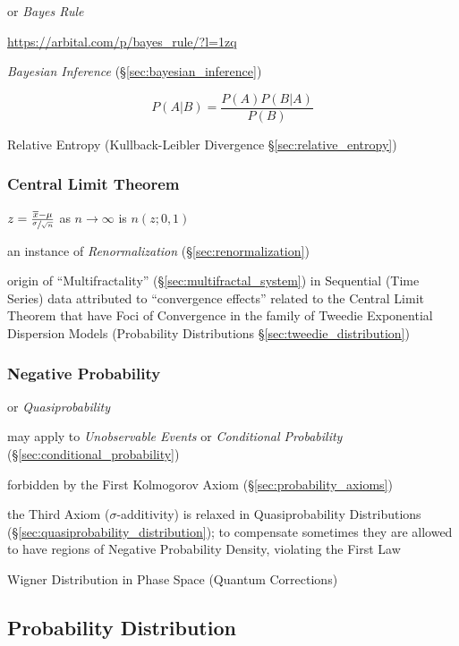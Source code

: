or \emph{Bayes Rule}

\url{https://arbital.com/p/bayes_rule/?l=1zq}

\emph{Bayesian Inference} (\S\ref{sec:bayesian_inference})

\[
  P(A|B) = \frac{P(A)P(B|A)}{P(B)}
\]

\fist Relative Entropy (Kullback-Leibler Divergence
\S\ref{sec:relative_entropy})



\subsubsection{Central Limit Theorem}\label{sec:central_limit}

$z = \frac{\overline{x} - \mu}{\sfrac{\sigma}{\sqrt{n}}}$ as
$n \rightarrow \infty$ is $n(z; 0,1)$ %

\fist an instance of \emph{Renormalization} (\S\ref{sec:renormalization})

\fist origin of ``Multifractality'' (\S\ref{sec:multifractal_system}) in
Sequential (Time Series) data attributed to ``convergence effects'' related to
the Central Limit Theorem that have Foci of Convergence in the family of Tweedie
Exponential Dispersion Models (Probability Distributions
\S\ref{sec:tweedie_distribution})



\subsubsection{Negative Probability}\label{sec:negative_probability}

or \emph{Quasiprobability}

may apply to \emph{Unobservable Events} or \emph{Conditional Probability}
(\S\ref{sec:conditional_probability})

forbidden by the First Kolmogorov Axiom (\S\ref{sec:probability_axioms})

the Third Axiom ($\sigma$-additivity) is relaxed in Quasiprobability
Distributions (\S\ref{sec:quasiprobability_distribution}); to compensate
sometimes they are allowed to have regions of Negative Probability Density,
violating the First Law

Wigner Distribution in Phase Space (Quantum Corrections)



\subsection{Probability Distribution}
\label{sec:probability_distribution}

